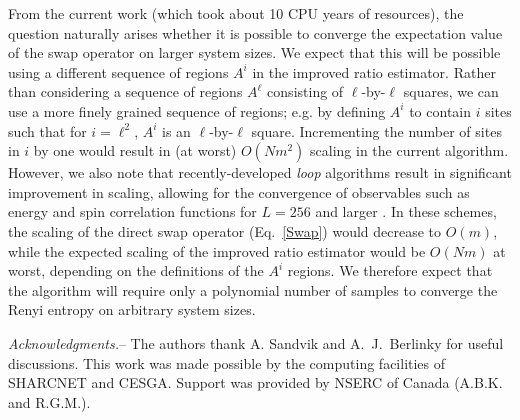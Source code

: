 \documentclass[prl,aps,twocolumn,floatfix,amsmath,amssymb,superscriptaddress,tightenlines]{revtex4}
\begin{document}
From the current work (which took about 10 CPU years of resources), 
the question naturally arises whether it is possible to converge the expectation value of the swap operator on
larger system sizes. 
We expect that this will be possible using a different
sequence of regions $A^i$ in the improved ratio estimator.
Rather than considering a sequence of regions $A^{\ell}$ consisting of $\ell$-by-$\ell$ squares, 
we can use a more finely grained sequence of regions; e.g. by defining $A^i$ to contain
$i$ sites such that for $i=\ell^2$, $A^i$ is an $\ell$-by-$\ell$ square.  Incrementing the number of sites in $i$ by one would result in
(at worst) $O(Nm^2)$ scaling in the current algorithm.  
However, we also note that recently-developed {\it loop} algorithms
result in significant improvement in scaling, allowing for the convergence of observables such as energy and spin correlation functions for $L=256$ and larger \cite{AWSloop}.  In these schemes, the scaling of the direct swap operator (Eq.~\eqref{Swap}) 
would decrease to $O(m)$, while the expected scaling of the improved ratio estimator would be $O(Nm)$ at worst, depending
on the definitions of the $A^i$ regions.
We therefore expect that the algorithm will require only a polynomial number of samples to converge the Renyi entropy on arbitrary system sizes.


{\it Acknowledgments.}-- The authors thank A. Sandvik and A.~J.~Berlinky for useful discussions.
This work was made possible by the
computing facilities of SHARCNET and CESGA.  Support was provided by NSERC
of Canada (A.B.K. and R.G.M.).


\end{document}
